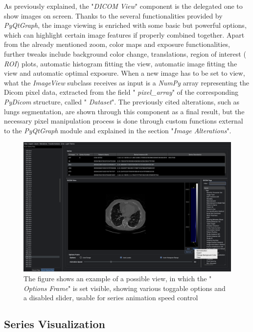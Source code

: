 \documentclass[conference]{IEEEtran}
\begin{document}
As previously explained, the "\textit{DICOM View}" component is the delegated one to show images on screen. Thanks to the several functionalities provided by  \textit{PyQtGraph}, the image viewing is enriched with some basic but powerful options, which can highlight certain image features if properly combined together. Apart from the already mentioned zoom, color maps and exposure functionalities, further tweaks include background color change, translations, region of interest ( \textit{ROI}) plots, automatic histogram fitting the view, automatic image fitting the view and automatic optimal exposure.
When a new image has to be set to view, what the  \textit{ImageView} subclass receives as input is a  \textit{NumPy} array representing the Dicom pixel data, extracted from the field " \textit{pixel\_array}" of the corresponding  \textit{PyDicom} structure, called " \textit{Dataset}". The previously cited alterations, such as lungs segmentation, are shown through this component as a final result, but the necessary pixel manipulation process is done through custom functions external to the  \textit{PyQtGraph} module and explained in the section "\textit{Image Alterations}".

\begin{figure}[h]
  \includegraphics[width=\columnwidth]
    {overall.png}\hfill
  \caption{The figure shows an example of a possible view, in which the " \textit{Options Frame}" is set visible, showing various toggable options and a disabled slider, usable for series animation speed control}
\end{figure}


\subsection{Series Visualization}
\end{document}
